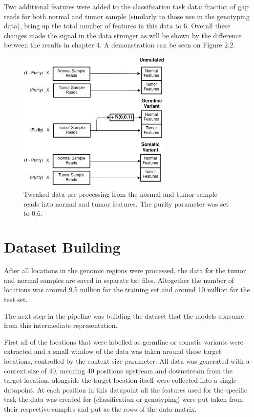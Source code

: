 \documentclass[bsc,frontabs,singlespacing,parskip,deptreport]{infthesis}
\begin{document}
Two additional features were added to the classification task data: fraction of gap reads for both normal and tumor sample (similarly to those use in the genotyping data), bring up the total number of features in this data to 6. Overall these changes made the signal in the data stronger as will be shown by the difference between the results in chapter 4. A demonstration can be seen on Figure 2.2.

\begin{figure}
\centering
\includegraphics[width = 3in]{preprocess_tweaked}
\setlength{\belowcaptionskip}{0pt}
\caption{Tweaked data pre-processing from the normal and tumor sample reads into normal and tumor features. The purity parameter was set to 0.6.}
\label{preprocess_tweaked}
\vskip -5mm
\end{figure}

\section{Dataset Building}

After all locations in the genomic regions were processed, the data for the tumor and normal samples are saved in separate txt files. Altogether the number of locations was around 9.5 million for the training set and around 10 million for the test set.

The next step in the pipeline was building the dataset that the models consume from this intermediate representation. 

First all of the locations that were labelled as germline or somatic variants were extracted and a small window of the data was taken around these target locations, controlled by the context size parameter. All data was generated with a context size of 40, meaning 40 positions upstream and downstream from the target location, alongside the target location itself were collected into a single datapoint. At each position in this datapoint all the features used for the specific task the data was created for (classification or genotyping) were put taken from their respective samples and put as the rows of the data matrix.
\end{document}
